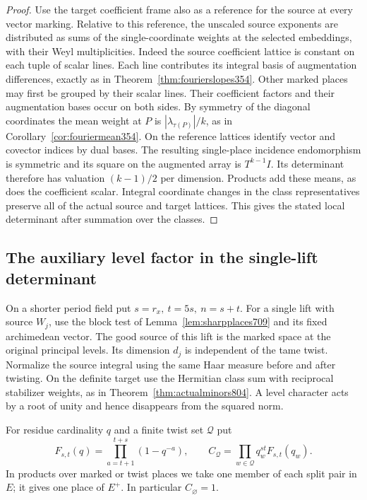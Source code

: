\documentclass[a4paper,11pt]{article}
\theoremstyle{definition}
\theoremstyle{remark}
\numberwithin{equation}{section}
\begin{document}
\begin{proof}
Use the target coefficient frame also as a reference for the
source at every vector marking. Relative to this reference,
the unscaled source exponents are distributed as sums of the
single-coordinate weights at the selected embeddings, with
their Weyl multiplicities. Indeed the source coefficient lattice
is constant on each tuple of scalar lines. Each line contributes
its integral basis of augmentation differences, exactly as
in Theorem~\ref{thm:fourierslopes354}. Other marked places may
first be grouped by their scalar lines. Their coefficient
factors and their augmentation bases occur on both sides.
By symmetry of the diagonal coordinates the mean weight at
\(P\) is \(|\lambda_{\tau(P)}|/k\), as in
Corollary~\ref{cor:fouriermean354}. On the reference lattices
identify vector and covector indices by dual bases. The resulting
single-place incidence endomorphism is symmetric and its square
on the augmented array is \(T^{k-1}I\). Its determinant therefore
has valuation \((k-1)/2\) per dimension. Products add these
means, as does the coefficient scalar. Integral coordinate
changes in the class representatives preserve all of the actual
source and target lattices. This gives the stated local
determinant after summation over the classes.
\end{proof}


\subsection{The auxiliary level factor in the single-lift determinant}
\label{sec:auxdet805}
On a shorter period field put \(s=r_x,\ t=5s,\ n=s+t\).
For a single lift with source \(W_j\), use the block test of
Lemma~\ref{lem:sharpplaces709} and its fixed archimedean vector.
The good source of this lift is the marked space at the original
principal levels. Its dimension \(d_j\) is independent of the
tame twist. Normalize the source integral using the same Haar
measure before and after twisting. On the definite target use
the Hermitian class sum with reciprocal stabilizer weights, as
in Theorem~\ref{thm:actualminors804}. A level character acts by
a root of unity and hence disappears from the squared norm.

For residue cardinality \(q\) and a finite twist set \(\mathcal Q\)
put
\[
     F_{s,t}(q)=\prod_{a=t+1}^{t+s}(1-q^{-a}),\qquad
     C_{\mathcal Q}=\prod_{w\in\mathcal Q}q_w^{st}F_{s,t}(q_w).
\]
In products over marked or twist places we take one member of
each split pair in \(E\); it gives one place of \(E^+\).
In particular \(C_{\varnothing}=1\).
\end{document}
